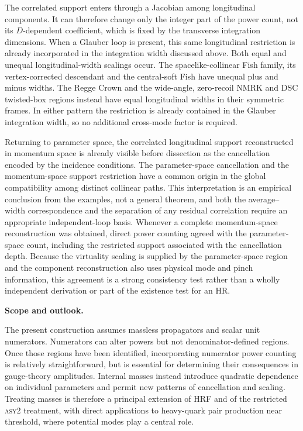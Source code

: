 \documentclass[a4paper,11pt]{article}
\begin{document}
The correlated support enters through a Jacobian among longitudinal
components.  It can therefore change only the integer part of the power count,
not its \(D\)-dependent coefficient, which is fixed by the transverse
integration dimensions.  When a Glauber loop is present, this same
longitudinal restriction is already incorporated in the integration width
discussed above.  Both equal and unequal longitudinal-width scalings occur.
The spacelike-collinear Fish family, its vertex-corrected descendant and the
central-soft Fish have unequal plus and minus widths.  The Regge Crown and the
wide-angle, zero-recoil NMRK and DSC twisted-box regions instead have equal
longitudinal widths in their symmetric frames.  In either pattern the
restriction is already contained in the Glauber integration width, so no
additional cross-mode factor is required.

Returning to parameter space, the correlated longitudinal support reconstructed
in momentum space is already visible before dissection as the cancellation
encoded by the incidence conditions.  The parameter-space cancellation and
the momentum-space support restriction have a common origin in the global
compatibility among distinct collinear paths.
This interpretation is an empirical conclusion
from the examples, not a general theorem, and both the average--width
correspondence and the separation of any residual correlation require an
appropriate independent-loop basis.  Whenever a complete momentum-space
reconstruction was obtained, direct power counting agreed with the
parameter-space count, including the restricted support associated with the
cancellation depth.
Because the virtuality scaling is supplied by the parameter-space region and
the component reconstruction also uses physical mode and pinch information,
this agreement is a strong consistency test rather than a wholly independent
derivation or part of the existence test for an HR.

\noindent\begin{minipage}{\textwidth}
\medskip
\noindent\textbf{Scope and outlook.}\par\nopagebreak\smallskip\nopagebreak

The present construction assumes massless propagators and scalar unit
numerators.  Numerators can alter powers but not denominator-defined regions.
Once those regions have been identified, incorporating numerator power
counting is relatively straightforward, but is essential for determining
their consequences in gauge-theory amplitudes.  Internal masses instead
introduce quadratic dependence on individual parameters and permit new
patterns of cancellation and scaling.  Treating masses is therefore a
principal extension of HRF and of the restricted \textsc{asy2} treatment,
with direct applications to heavy-quark pair production near threshold, where
potential modes play a central role.
\end{minipage}\par\medskip
\end{document}
